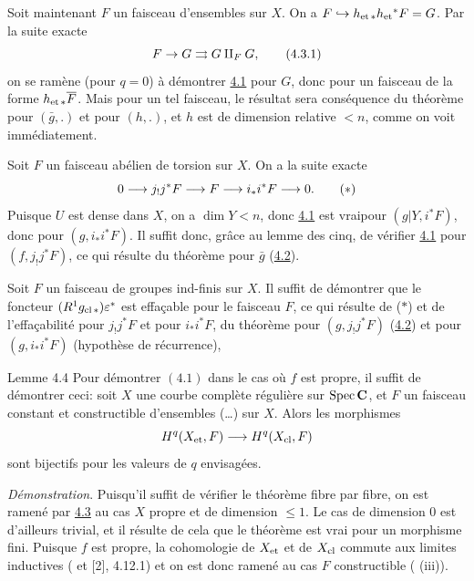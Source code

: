 \documentclass[10pt]{../fichiers-configuration-latex/smfart}
\begin{document}
Soit maintenant $F$ un faisceau d'ensembles sur $X$. On a
$F\hookrightarrow h_{\text{\rm et\,}\ast}h_{\et}{}^{\ast}F=G$. Par la suite exacte
\begin{equation*}
F\rightarrow G\rightrightarrows G\amalg_F G{\quoi},\tag{4.3.1}
\end{equation*}
on se ramène (pour $q=0$) à démontrer \hyperref[XVI.thm4.1]{4.1} pour $G$, donc pour un
faisceau de la forme $h_{\text{\rm et\,}\ast}\bar{F}$. Mais pour un
tel faisceau, le résultat sera conséquence du théorème pour
$(\bar{g},.)$ et pour $(h,.)$, et $h$ est de dimension relative $<n$,
comme on voit immédiatement.

Soit $F$ un faisceau abélien de torsion sur $X$. On a la suite exacte
\begin{equation*}
0\longrightarrow j_{!}j^{\ast}F\longrightarrow F\longrightarrow
i_{\ast}i^{\ast}F\longrightarrow 0{\quoi}.\tag{$\ast$}
\end{equation*}
Puisque $U$ est dense dans $X$, on a $\dim Y<n$, donc \hyperref[XVI.thm4.1]{4.1} est 
vrai\pageoriginale pour $(g|Y, i^{\ast}F)$, donc pour
$(g,i_{\ast}i^{\ast}F)$. Il suffit donc, grâce au lemme des cinq, de
vérifier \hyperref[XVI.thm4.1]{4.1} pour $(f,j_{!}j^{\ast}F)$, ce qui résulte du théorème
pour $\bar{g}$ (\hyperref[XVI.lem4.2]{4.2}).

Soit $F$ un faisceau de groupes ind-finis sur $X$. Il suffit de
démontrer que le foncteur $(R^{1}g_{\cl\ast})\epsilon^{\ast}$ est
effaçable pour le faisceau $F$, ce qui résulte de ($\ast$) et de
l'effaçabilité pour $j_{!}j^{\ast}F$ et pour $i_{\ast}i^{\ast}F$,
\ie du théorème pour $(g,j_{!}j^{\ast}F)$ (\hyperref[XVI.lem4.2]{4.2}) et pour
$(g,i_{\ast}i^{\ast}F)$ (hypothèse de récurrence), \cqfd

\begin{enonce*}{Lemme 4.4}
Pour démontrer $(4.1)$ dans le cas où $f$ est propre, il suffit de
démontrer ceci: soit $X$ une courbe complète régulière sur $\Spec
\CC$, et $F$ un faisceau constant et constructible d'ensembles
(\resp\ldots) sur $X$. Alors les morphismes
$$
H^{q}(X_{\et},F)\longrightarrow H^{q}(X_{\cl},F)
$$
sont bijectifs pour les valeurs de $q$ envisagées.
\end{enonce*}

\noindent
\emph{Démonstration}. Puisqu'il suffit de vérifier le théorème fibre
par fibre, on est ramené par \hyperref[XVI.lem4.3]{4.3} au cas $X$ propre et de dimension
$\leq 1$. Le cas de dimension $0$ est d'ailleurs trivial, et il
résulte de cela que le théorème est vrai pour un morphisme
fini. Puisque $f$ est propre, la cohomologie de $X_{\et}$ et
de $X_{\cl}$ commute aux limites inductives (
et [2], 4.12.1) et on est donc ramené au cas $F$ constructible ( (iii)).
\end{document}
